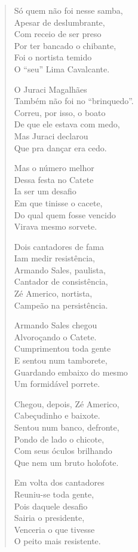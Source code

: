 \begin{verse}
Só quem não foi nesse samba,\\
Apesar de deslumbrante,\\
Com receio de ser preso\\
Por ter bancado o chibante,\\
Foi o nortista temido\\
O “seu” Lima Cavalcante.

O Juraci Magalhães\\
Também não foi no “brinquedo”.\\
Correu, por isso, o boato\\
De que ele estava com medo,\\
Mas Juraci declarou\\
Que pra dançar era cedo.

Mas o número melhor\\
Dessa festa no Catete\\
Ia ser um desafio\\
Em que tinisse o cacete,\\
Do qual quem fosse vencido\\
Virava mesmo sorvete.

Dois cantadores de fama\\
Iam medir resistência,\\
Armando Sales, paulista,\\
Cantador de consistência,\\
Zé Americo, nortista,\\
Campeão na persistência.


Armando Sales chegou\\
Alvoroçando o Catete.\\
Cumprimentou toda gente\\
E sentou num tamborete,\\
Guardando embaixo do mesmo\\
Um formidável porrete.

Chegou, depois, Zé Americo,\\
Cabeçudinho e baixote.\\
Sentou num banco, defronte,\\
Pondo de lado o chicote,\\
Com seus óculos brilhando\\
Que nem um bruto holofote.

Em volta dos cantadores\\
Reuniu-se toda gente,\\
Pois daquele desafio\\
Sairia o presidente,\\
Venceria o que tivesse\\
O peito mais resistente. 


\end{verse}
